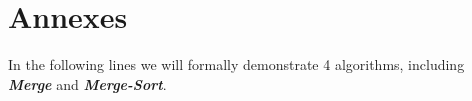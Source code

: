 \section{Annexes}

In the following lines we will formally demonstrate 4 algorithms, including {\bfseries\itshape Merge} and {\bfseries\itshape Merge-Sort}.
